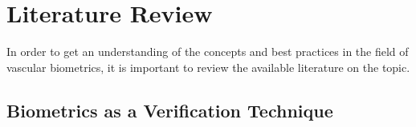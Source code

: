 \chapter{Literature Review}

In order to get an understanding of the concepts and best practices in the field of vascular biometrics, it is important to review the available literature on the topic.






\section{Biometrics as a Verification Technique}


